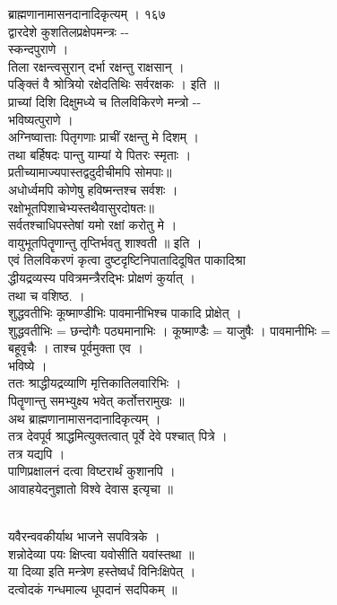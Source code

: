 \documentclass[11pt, openany]{book}
\begin{document}
{{{{{{ }{ ब्राह्मणानामासनदानादिकृत्यम् । १६७}{\\
द्वारदेशे कुशतिलप्रक्षेपमन्त्रः -\/-\\
स्कन्दपुराणे ।\\
तिला रक्षन्त्वसुरान् दर्भा रक्षन्तु राक्षसान् ।\\
पङ्क्तिं वै श्रोत्रियो रक्षेदतिथिः सर्वरक्षकः । इति ॥\\
प्राच्यां दिशि दिक्षुमध्ये च तिलविकिरणे मन्त्रो -\/-\\
भविष्यत्पुराणे ।\\
अग्निष्वात्ताः पितृगणाः प्राचीं रक्षन्तु मे दिशम् ।\\
तथा बर्हिषदः पान्तु याम्यां ये पितरः स्मृताः ।\\
प्रतीच्यामाज्यपास्तद्वदुदीचीमपि सोमपाः}{॥ }{\\
अधोर्ध्वमपि कोणेषु हविष्मन्तश्च सर्वशः ।\\
रक्षोभूतपिशाचेभ्यस्तथैवासुरदोषतः}{॥ }{\\
सर्वतश्चाधिपस्तेषां यमो रक्षां करोतु मे ।\\
वायुभूतपि}{तॄ}{णान्तु तृप्तिर्भवतु शाश्वती ॥ इति ।\\
एवं तिलविकरणं कृत्वा दुष्टदृष्टिनिपातादिदूषित पाकादिश्रा\\
द्धीयद्रव्यस्य पवित्रमन्त्रैरद्भिः प्रोक्षणं कुर्यात् ।\\
तथा च वशिष्ठ. ।\\
शुद्धवतीभिः कूष्माण्डीभिः पावमानीभिश्च पाकादि प्रोक्षेत् ।\\
शुद्धवतीभिः = छन्दोगैः पठ्यमानाभिः । कूष्माण्डैः = याजुषैः । पावमानीभिः
=\\
बहूवृचैः । ताश्च पूर्वमुक्ता एव ।\\
भविष्ये ।\\
ततः श्राद्धीयद्रव्याणि मृत्तिकातिलवारिभिः ।\\
पितॄणान्तु समभ्युक्ष्य भवेत् कर्तोत्तरामुखः ॥\\
अथ ब्राह्मणानामासनदानादिकृत्यम् ।\\
तत्र देवपूर्व श्राद्धमित्युक्तत्वात् पूर्वे देवे पश्चात् पित्रे ।\\
तत्र यद्यपि ।\\
पाणिप्रक्षालनं दत्वा विष्टरार्थं कुशानपि ।\\
आवाहयेदनुज्ञातो विश्वे देवास इत्यृचा }{॥ }{\\
यवैरन्ववकीर्याथ भाजने सपवित्रके ।\\
शन्नोदेव्या पयः क्षिप्त्वा यवोसीति यवांस्तथा ॥\\
या दिव्या इति मन्त्रेण हस्तेष्वर्धं विनिःक्षिपेत् ।\\
दत्वोदकं गन्धमाल्य धूपदानं सदपिकम् ॥ 

}}}}}}
\end{document}
